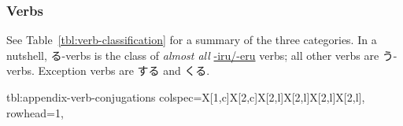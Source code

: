 \documentclass[../nihongo-gakushuu-kyouzai.tex]{subfiles}
\begin{document}
\subsubsection{Verbs}
See Table~\ref{tbl:verb-classification} for a summary of the three categories. In a nutshell, る-verbs is the class of \emph{almost all} \ul{-iru/-eru} verbs; all other verbs are う-verbs. Exception verbs are する and くる. 

{tbl:appendix-verb-conjugations}  %
{
    colspec={X[1,c]X[2,c]X[2,l]X[2,l]X[2,l]X[2,l]},
    rowhead=1,
}  %
\end{document}
